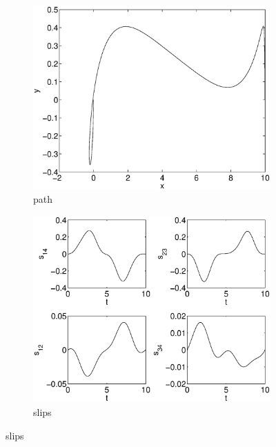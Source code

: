 \begin{figure}[h]
\begin{subfigure}[b]{\textwidth}
\centering
\includegraphics[height=0.3\textheight]{img/final_15_1_10_path.eps}
\caption{path}
\end{subfigure}

\begin{subfigure}[b]{\textwidth}
\centering
\includegraphics[height=0.3\textheight]{img/final_15_1_10_slips.eps}
\caption{slips}
\end{subfigure}


\end{figure}
